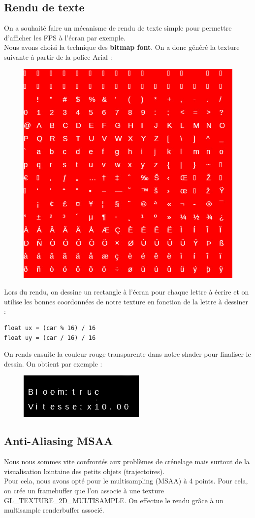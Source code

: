 \documentclass[11pt,a4paper]{article}
\begin{document}
\subsection{Rendu de texte}

On a souhaité faire un mécanisme de rendu de texte simple pour permettre d'afficher les FPS à l'écran par exemple. \\
Nous avons choisi la technique des \textbf{bitmap font}. On a donc généré la texture suivante à partir de la police Arial :
\begin{figure}[h!]
\centering
\includegraphics[width=0.25\columnwidth]{img/Arial.jpg}
\end{figure}

Lors du rendu, on dessine un rectangle à l'écran pour chaque lettre à écrire et on utilise les bonnes coordonnées de notre texture en fonction de la lettre à dessiner :
\begin{lstlisting}
float ux = (car % 16) / 16
float uy = (car / 16) / 16
\end{lstlisting}
On rends ensuite la couleur rouge transparente dans notre shader pour finaliser le dessin. On obtient par exemple :
\begin{figure}[h!]
\centering
\includegraphics[width=0.25\columnwidth]{img/text.png}
\end{figure}

\subsection{Anti-Aliasing MSAA}
Nous nous sommes vite confrontés aux problèmes de crénelage mais surtout de la visualisation lointaine des petits objets (trajectoires).\\

Pour cela, nous avons opté pour le multisampling (MSAA) à 4 points. Pour cela, on crée un framebuffer que l'on associe à 
une texture \textsc{GL\_TEXTURE\_2D\_MULTISAMPLE}. On effectue le rendu grâce à un multisample renderbuffer associé.\\
\end{document}
